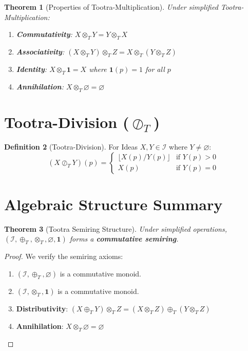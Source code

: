 \documentclass[11pt,twoside,openright]{book}
\theoremstyle{definition}
\newtheorem{definition}{Definition}[chapter]
\theoremstyle{plain}
\newtheorem{theorem}[definition]{Theorem}
\theoremstyle{remark}
\newcommand{\Ideas}{\mathcal{I}}
\newcommand{\Tadd}{\oplus_T}
\newcommand{\Tmul}{\otimes_T}
\newcommand{\Tdiv}{\oslash_T}
\begin{document}
\begin{theorem}[Properties of Tootra-Multiplication]
\label{thm:tmul-properties}
Under simplified Tootra-Multiplication:
\begin{enumerate}
  \item \textbf{Commutativity}: $X \Tmul Y = Y \Tmul X$
  \item \textbf{Associativity}: $(X \Tmul Y) \Tmul Z = X \Tmul (Y \Tmul Z)$
  \item \textbf{Identity}: $X \Tmul \mathbf{1} = X$ where $\mathbf{1}(p) = 1$ for all $p$
  \item \textbf{Annihilation}: $X \Tmul \varnothing = \varnothing$
\end{enumerate}
\end{theorem}

\section{Tootra-Division ($\Tdiv$)}

\begin{definition}[Tootra-Division]
\label{def:tootra-div}
For Ideas $X, Y \in \Ideas$ where $Y \neq \varnothing$:
\[
(X \Tdiv Y)(p) = \begin{cases}
\lfloor X(p) / Y(p) \rfloor & \text{if } Y(p) > 0 \\
X(p) & \text{if } Y(p) = 0
\end{cases}
\]
\end{definition}

\section{Algebraic Structure Summary}

\begin{theorem}[Tootra Semiring Structure]
\label{thm:semiring}
Under simplified operations, $(\Ideas, \Tadd, \Tmul, \varnothing, \mathbf{1})$ forms a \textbf{commutative semiring}.
\end{theorem}

\begin{proof}
We verify the semiring axioms:
\begin{enumerate}
  \item $(\Ideas, \Tadd, \varnothing)$ is a commutative monoid.
  \item $(\Ideas, \Tmul, \mathbf{1})$ is a commutative monoid.
  \item \textbf{Distributivity}: $(X \Tadd Y) \Tmul Z = (X \Tmul Z) \Tadd (Y \Tmul Z)$
  \item \textbf{Annihilation}: $X \Tmul \varnothing = \varnothing$
\end{enumerate}
\end{proof}
\end{document}
